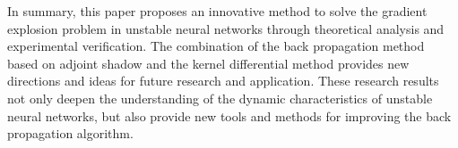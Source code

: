 \begin{abstract*}
  In summary, this paper proposes an innovative method to solve the gradient explosion problem in unstable neural networks through theoretical analysis and experimental verification. The combination of the back propagation method based on adjoint shadow and the kernel differential method provides new directions and ideas for future research and application. These research results not only deepen the understanding of the dynamic characteristics of unstable neural networks, but also provide new tools and methods for improving the back propagation algorithm.

\end{abstract*}
